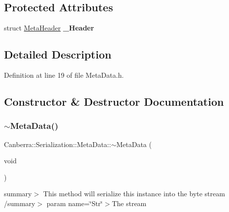 \subsection*{Protected Attributes}
\begin{DoxyCompactItemize}
\item 
\mbox{\label{class_canberra_1_1_serialization_1_1_meta_data_af92b1f2a087fe1a0cca50e64500ae02a}} 
struct \hyperlink{struct_canberra_1_1_serialization_1_1_meta_header}{Meta\+Header} {\bfseries \+\_\+\+Header}
\end{DoxyCompactItemize}


\subsection{Detailed Description}


Definition at line 19 of file Meta\+Data.\+h.



\subsection{Constructor \& Destructor Documentation}
\mbox{\label{class_canberra_1_1_serialization_1_1_meta_data_a6f64327b5e5669fd8ffd8d17c6bc3671_a6f64327b5e5669fd8ffd8d17c6bc3671}} 
\subsubsection{\texorpdfstring{$\sim$\+Meta\+Data()}{~MetaData()}}
{\footnotesize\ttfamily Canberra\+::\+Serialization\+::\+Meta\+Data\+::$\sim$\+Meta\+Data (\begin{DoxyParamCaption}\item[{void}]{ }\end{DoxyParamCaption})\hspace{0.3cm}{\ttfamily [virtual]}}

summary$>$ This method will serialize this instance into the byte stream /summary$>$ param name=\char`\"{}\+Str\char`\"{}$>$The stream

